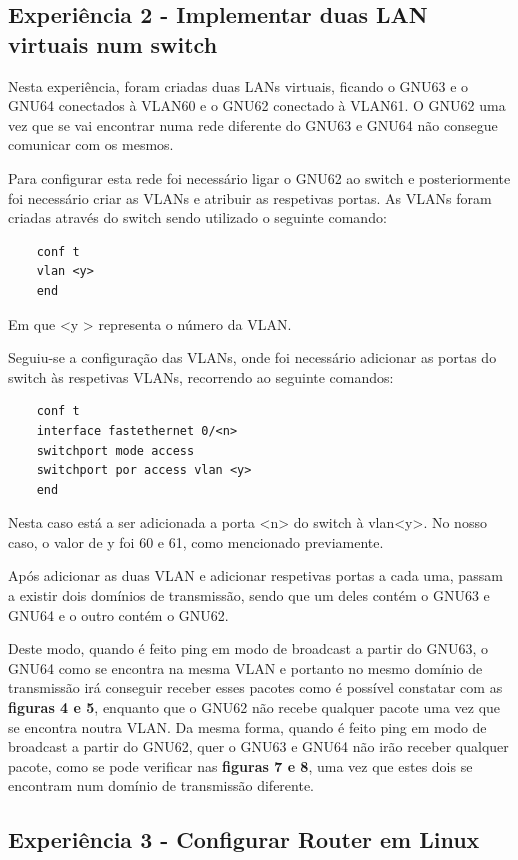 \documentclass[article, a4paper, 11pt, oneside]{memoir}
\begin{document}
\subsection{Experiência 2 - Implementar duas LAN virtuais num switch}

Nesta experiência, foram criadas duas LANs virtuais, ficando o GNU63 e o GNU64 conectados à VLAN60 e o GNU62 conectado à VLAN61.
O GNU62 uma vez que se vai encontrar numa rede diferente do GNU63 e GNU64 não consegue comunicar com os mesmos.


Para configurar esta rede foi necessário ligar o GNU62 ao switch e posteriormente foi necessário criar as VLANs e atribuir as respetivas portas.
As VLANs foram criadas através do switch sendo utilizado o seguinte comando:
\begin{lstlisting}
	conf t
	vlan <y>
	end
\end{lstlisting} 
Em que \textless y \textgreater{} representa o número da VLAN.

Seguiu-se a configuração das VLANs, onde foi necessário adicionar as portas do switch às respetivas VLANs, recorrendo ao seguinte comandos:
\begin{lstlisting}
	conf t
	interface fastethernet 0/<n>
	switchport mode access
	switchport por access vlan <y>
	end
\end{lstlisting} 
Nesta caso está a ser adicionada a porta \textless n\textgreater{} do switch à vlan\textless y\textgreater{}. No nosso caso, o valor de y foi 60 e 61, 
como mencionado previamente.

Após adicionar as duas VLAN e adicionar respetivas portas a cada uma, 
passam a existir dois domínios de transmissão, sendo que um deles contém o GNU63 e GNU64 e o outro contém o GNU62.

Deste modo, quando é feito ping em modo de broadcast a partir do GNU63, o GNU64 como se encontra na mesma VLAN e portanto no mesmo domínio de transmissão
irá conseguir 
receber esses pacotes como é possível constatar com as \textbf{figuras 4 e 5}, enquanto que o GNU62 não recebe qualquer pacote uma vez que se encontra noutra VLAN.
Da mesma forma, quando é feito ping em modo de broadcast a partir do GNU62, quer o GNU63 e GNU64 não irão receber qualquer pacote, como se pode verificar
nas \textbf{figuras 7 e 8}, uma vez que estes dois se encontram num domínio de transmissão diferente.


\subsection{Experiência 3 - Configurar Router em Linux}
\end{document}
